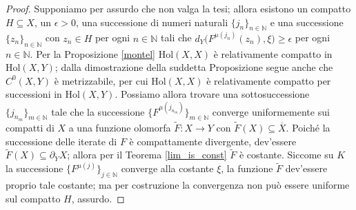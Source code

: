 \begin{proof}
    Supponiamo per assurdo che non valga la tesi; allora esistono un compatto $H\subseteq X$, un $\epsilon>0$, una successione di numeri naturali $\{j_n\}_{n\in\mathbb{N}}$ e una successione $\{z_n\}_{n\in\mathbb{N}}$ con $z_n\in H$ per ogni $n\in\mathbb{N}$ tali che $d_Y\big(F^{\mu(j_n)}(z_n),\xi\big)\ge\epsilon$ per ogni $n\in\mathbb{N}$. Per la Proposizione \ref{montel} $\text{Hol}(X,X)$ è relativamente compatto in $\text{Hol}(X,Y)$; dalla dimostrazione della suddetta Proposizione segue anche che $C^0(X,Y)$ è metrizzabile, per cui $\text{Hol}(X,X)$ è relativamente compatto per successioni in $\text{Hol}(X,Y)$. Possiamo allora trovare una sottosuccessione $\{j_{n_m}\}_{m\in\mathbb{N}}$ tale che la successione $\{F^{\mu(j_{n_m})}\}_{m\in\mathbb{N}}$ converge uniformemente sui compatti di $X$ a una funzione olomorfa $\tilde{F}:X \rightarrow Y$ con $\tilde{F}(X)\subseteq\overline{X}$. Poiché la successione delle iterate di $F$ è compattamente divergente, dev'essere $\tilde{F}(X)\subseteq\partial_YX$; allora per il Teorema \ref{lim_is_const} $\tilde{F}$ è costante. Siccome su $K$ la successione $\{F^{\mu(j)}\}_{j\in\mathbb{N}}$ converge alla costante $\xi$, la funzione $\tilde{F}$ dev'essere proprio tale costante; ma per costruzione la convergenza non può essere uniforme sul compatto $H$, assurdo.
\end{proof}